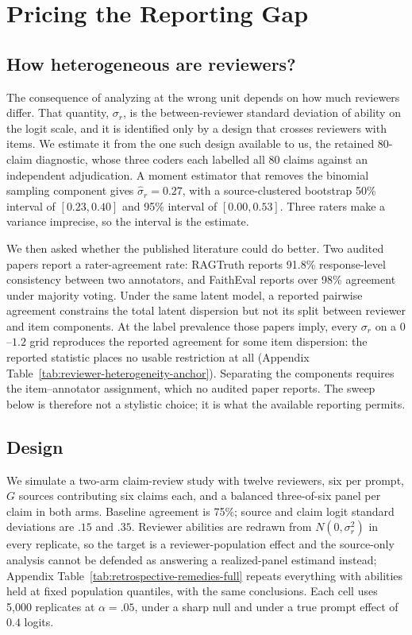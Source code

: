 \documentclass[11pt]{article}
\begin{document}
\section{Pricing the Reporting Gap}
\label{sec:simulation}

\subsection{How heterogeneous are reviewers?}

The consequence of analyzing at the wrong unit depends on how much reviewers
differ. That quantity, $\sigma_r$, is the between-reviewer standard deviation
of ability on the logit scale, and it is identified only by a design that
crosses reviewers with items. We estimate it from the one such design
available to us, the retained 80-claim diagnostic, whose three coders each
labelled all 80 claims against an independent adjudication. A moment estimator
that removes the binomial sampling component gives $\hat\sigma_r = 0.27$, with
a source-clustered bootstrap 50\% interval of $[0.23, 0.40]$ and 95\% interval
of $[0.00, 0.53]$. Three raters make a variance imprecise, so the interval is
the estimate.

We then asked whether the published literature could do better. Two audited
papers report a rater-agreement rate: RAGTruth reports 91.8\% response-level
consistency between two annotators, and FaithEval reports over 98\% agreement
under majority voting. Under the same latent model, a reported pairwise
agreement constrains the total latent dispersion but not its split between
reviewer and item components. At the label prevalence those papers imply,
every $\sigma_r$ on a $0$--$1.2$ grid reproduces the reported agreement for
some item dispersion: the reported statistic places no usable restriction at
all (Appendix Table~\ref{tab:reviewer-heterogeneity-anchor}). Separating the
components requires the item--annotator assignment, which no audited paper
reports. The sweep below is therefore not a stylistic choice; it is what the
available reporting permits.

\subsection{Design}

We simulate a two-arm claim-review study with twelve reviewers, six per
prompt, $G$ sources contributing six claims each, and a balanced three-of-six
panel per claim in both arms. Baseline agreement is 75\%; source and claim
logit standard deviations are $.15$ and $.35$. Reviewer abilities are redrawn
from $N(0,\sigma_r^2)$ in every replicate, so the target is a
reviewer-population effect and the source-only analysis cannot be defended as
answering a realized-panel estimand instead; Appendix
Table~\ref{tab:retrospective-remedies-full} repeats everything with abilities
held at fixed population quantiles, with the same conclusions. Each cell uses
5,000 replicates at $\alpha=.05$, under a sharp null and under a true prompt
effect of $0.4$ logits.
\end{document}
